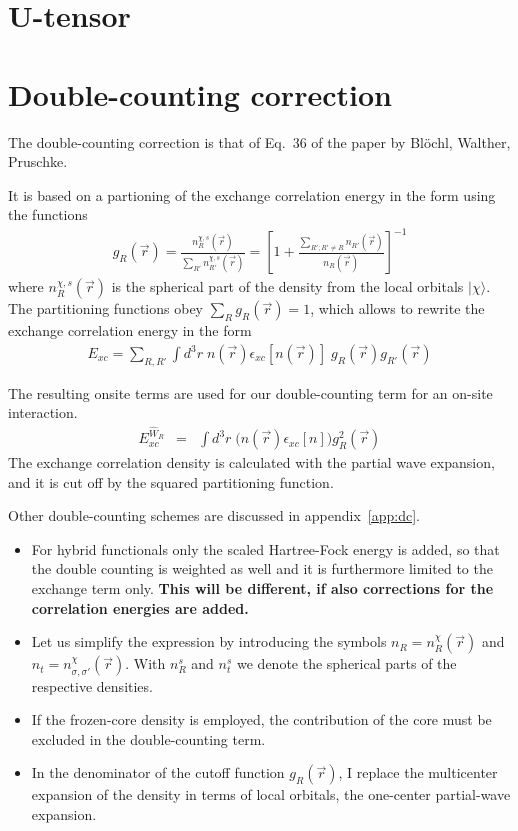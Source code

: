 \documentclass[11pt,a4paper]{report}
\begin{document}
\section{U-tensor}
\section{Double-counting correction}
The double-counting correction is that of Eq.~36 of the paper by
Bl\"ochl, Walther, Pruschke\cite{bloechl11_prb84_205101}.

It is based on a partioning of the exchange correlation energy in the form
using the functions 
\begin{eqnarray}
g_R(\vec{r})
=\frac{n^{\chi,s}_R(\vec{r})}{\sum_{R'}n^{\chi,s}_{R'}(\vec{r})}
=\left[1+\frac{\sum_{R';R'\neq R} n_{R'}(\vec{r})}{n_{R}(\vec{r})}\right]^{-1}
\end{eqnarray}
where $n^{\chi,s}_R(\vec{r})$ is the spherical part of the density from
the local orbitals $|\chi\rangle$.  The partitioning functions obey
$\sum_R g_R(\vec{r})=1$, which allows to rewrite the exchange
correlation energy in the form
\begin{eqnarray}
E_{xc}=\sum_{R,R'}\int d^3r\; 
n(\vec{r})\epsilon_{xc}[n(\vec{r})]\;g_R(\vec{r})g_{R'}(\vec{r})
\end{eqnarray}

The resulting onsite terms are used for our double-counting term for
an on-site interaction. 
\begin{eqnarray}
E_{xc}^{\hat{W}_R} &=& \int d^3r\; \biggl(n(\vec{r})
\epsilon_{xc}[n]\biggr) g_R^2(\vec{r})
\end{eqnarray}
The exchange correlation density is calculated with the partial wave
expansion, and it is cut off by the squared partitioning function.

Other double-counting schemes are discussed in appendix~\ref{app:dc}.

\begin{itemize}
\item For hybrid functionals only the scaled Hartree-Fock energy is
  added, so that the double counting is weighted as well and it is
  furthermore limited to the exchange term only. \textbf{This will be
    different, if also corrections for the correlation energies are
    added.}
%
\item Let us simplify the expression by introducing the symbols
  $n_R=n^\chi_R(\vec{r})$ and $n_t=n^\chi_{\sigma,\sigma'}(\vec{r})$.
  With $n^s_R$ and $n^s_t$ we denote the spherical parts of the
  respective densities.
%
\item If the frozen-core density is employed, the contribution of the
  core must be excluded in the double-counting term.
%
\item In the denominator of the cutoff function $g_R(\vec{r})$, I
  replace the multicenter expansion of the density in terms of local
  orbitals, the one-center partial-wave expansion.
\end{itemize}
\end{document}
